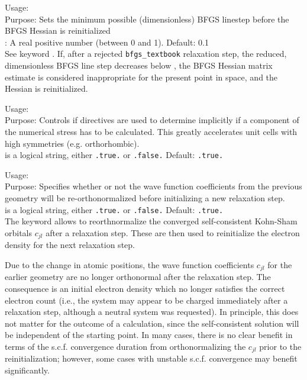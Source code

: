 {
  \noindent
  Usage:   \\[1.0ex]
  Purpose: Sets the minimum possible (dimensionless) BFGS linestep
    before the BFGS Hessian is reinitialized \\[1.0ex]
  : A real positive number (between 0 and 1). Default:
    0.1 \\
}
See keyword . If, after a rejected
\texttt{bfgs\_textbook} relaxation step, the reduced, dimensionless BFGS line
step decreases below , the BFGS Hessian
matrix estimate is considered inappropriate for the present point in
space, and the Hessian is reinitialized.

{
  \noindent
  Usage:   \\[1.0ex]
  Purpose: Controls if 
  directives are used to determine implicitly if a component of the numerical
  stress has to be calculated. This greatly accelerates unit cells
  with high symmetries (e.g. orthorhombic).  \\[1.0ex]
  is a logical string, either \texttt{.true.} or
    \texttt{.false.} Default: \texttt{.true.} \\
}

{
  \noindent
  Usage:   \\[1.0ex]
  Purpose: Specifies whether or not the wave function coefficients
    from the previous geometry will be re-orthonormalized before
    initializing a new relaxation step. \\[1.0ex]
   is a logical string, either \texttt{.true.} or
    \texttt{.false.} Default: \texttt{.true.} \\
}
The  keyword allows to
reorthnormalize the converged self-consistent Kohn-Sham orbitals
$c_{jl}$ after a relaxation step. These are then used to
reinitialize the electron density for the next relaxation step.

Due to the change in atomic positions, the wave function coefficients
$c_{jl}$ for the earlier geometry are no longer orthonormal after the
relaxation step. The consequence is an initial electron density which
no longer satisfies the correct electron count (i.e., the system may
appear to be charged immediately after a relaxation step, although a
neutral system was requested). In principle, this does not matter for
the outcome of a calculation, since the self-consistent solution will
be independent of the starting point. In many cases, there is no clear
benefit in terms of the s.c.f. convergence duration from
orthonormalizing the $c_{jl}$ prior to the reinitialization; however, some
cases with unstable s.c.f. convergence may benefit significantly.

